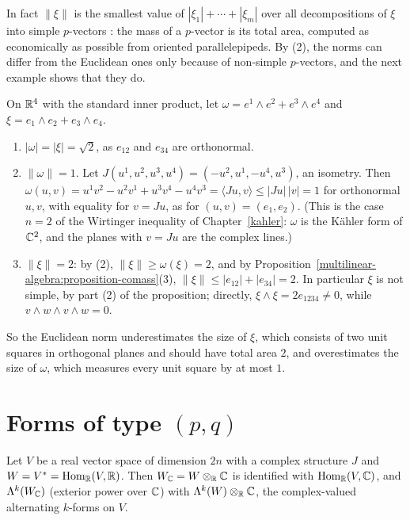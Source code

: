 In fact $\|\xi\|$ is the smallest value of $|\xi_1| + \cdots + |\xi_m|$ over all decompositions of $\xi$ into simple $p$-vectors \cite[1.8.1]{federer-gmt}: the mass of a $p$-vector is its total area, computed as
economically as possible from oriented parallelepipeds. By (2), the norms can differ from the Euclidean ones only because of non-simple $p$-vectors, and the next example shows that they do.

\begin{example}\label{multilinear-algebra:example-comass}
On $\mathbb{R}^4$ with the standard inner product, let $\omega = e^1 \wedge e^2 + e^3 \wedge e^4$ and $\xi = e_1 \wedge e_2 + e_3 \wedge e_4$.
\begin{enumerate}
\item $|\omega| = |\xi| = \sqrt 2$, as $e_{12}$ and $e_{34}$ are orthonormal.
\item $\|\omega\| = 1$. Let $J(u^1, u^2, u^3, u^4) = (-u^2, u^1, -u^4, u^3)$, an isometry. Then $\omega(u, v) = u^1v^2 - u^2v^1 + u^3v^4 - u^4v^3 = \langle Ju, v\rangle \leq |Ju|\,|v| = 1$ for orthonormal $u, v$, with
equality for $v = Ju$, as for $(u, v) = (e_1, e_2)$. (This is the case $n = 2$ of the Wirtinger inequality of Chapter~\ref{kahler}: $\omega$ is the K\"ahler form of $\mathbb{C}^2$, and the planes with $v = Ju$ are the complex
lines.)
\item $\|\xi\| = 2$: by (2), $\|\xi\| \geq \omega(\xi) = 2$, and by Proposition~\ref{multilinear-algebra:proposition-comass}(3), $\|\xi\| \leq |e_{12}| + |e_{34}| = 2$. In particular $\xi$ is not simple, by part (2) of the
proposition; directly, $\xi \wedge \xi = 2e_{1234} \neq 0$, while $v \wedge w \wedge v \wedge w = 0$.
\end{enumerate}
So the Euclidean norm underestimates the size of $\xi$, which consists of two unit squares in orthogonal planes and should have total area $2$, and overestimates the size of $\omega$, which measures every unit
square by at most $1$.
\end{example}

\section{Forms of type $(p,q)$}\label{multilinear-algebra:section-pq-forms}

Let $V$ be a real vector space of dimension $2n$ with a complex structure $J$ and $W = V^* = \operatorname{Hom}_{\mathbb{R}}(V, \mathbb{R})$.
Then $W_{\mathbb{C}} = W \otimes_{\mathbb{R}} \mathbb{C}$ is identified with $\operatorname{Hom}_{\mathbb{R}}(V, \mathbb{C})$, and $\Lambda^k(W_{\mathbb{C}})$ (exterior power over $\mathbb{C}$)
with $\Lambda^k(W) \otimes_{\mathbb{R}} \mathbb{C}$, the complex-valued alternating $k$-forms on $V$.

